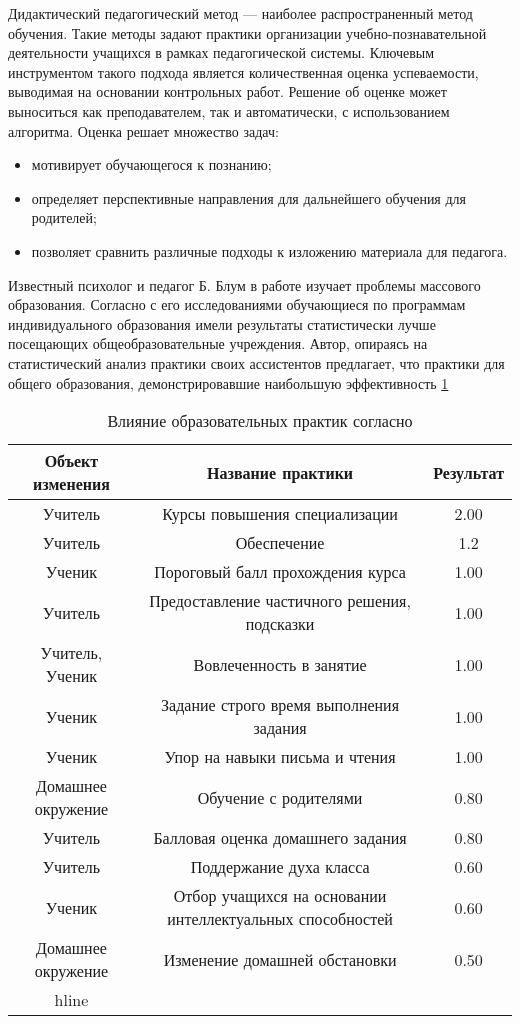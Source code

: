 Дидактический педагогический метод --- наиболее распространенный метод обучения.
Такие методы задают практики организации учебно-познавательной деятельности учащихся в рамках педагогической системы. Ключевым инструментом такого подхода является 
количественная оценка успеваемости, выводимая на основании контрольных работ. Решение об оценке может выноситься как преподавателем,
 так и автоматически, с использованием алгоритма. Оценка решает множество задач: 
 \begin{itemize}
    \item мотивирует обучающегося к познанию;
    \item определяет перспективные направления для дальнейшего обучения для родителей;
    \item позволяет сравнить различные подходы к изложению материала для педагога.
\end{itemize}

Известный психолог и педагог Б. Блум в работе \cite{bloom1984} изучает проблемы массового образования.
Согласно с его исследованиями обучающиеся по программам индивидуального образования имели результаты статистически лучше
посещающих общеобразовательные учреждения. Автор, опираясь на статистический анализ практики
своих ассистентов предлагает, что практики для общего образования, демонстрировавшие наибольшую эффективность \ref{bloom_table}

\begin{table}
    \centering
    \begin{tabular}{|c |c| c |}
        Объект изменения &	Название практики &  Результат\\
        \hline
        Учитель & Курсы повышения специализации &	2.00 \\	
        Учитель	& Обеспечение	& 1.2	\\	 
        Ученик	& Пороговый балл прохождения курса & 1.00	\\	
        Учитель	& Предоставление частичного решения, подсказки	& 1.00	\\	
        Учитель, Ученик	& Вовлеченность в занятие & 1.00	\\	
        Ученик	& Задание строго время выполнения задания &	1.00	\\
        Ученик & Упор на навыки письма и чтения & 	1.00	\\
        Домашнее окружение & Обучение с родителями &	0.80 \\	
        Учитель	& Балловая оценка домашнего задания	&0.80	\\
        Учитель	& Поддержание духа класса &	0.60	\\
        Ученик	& Отбор учащихся на основании интеллектуальных способностей	 &0.60	\\
        Домашнее окружение & Изменение домашней обстановки & 0.50 \\
        hline	
    \end{tabular}
    \caption{Влияние образовательных практик согласно \cite{bloom1984}}
    \label{bloom_table}
\end{table}

